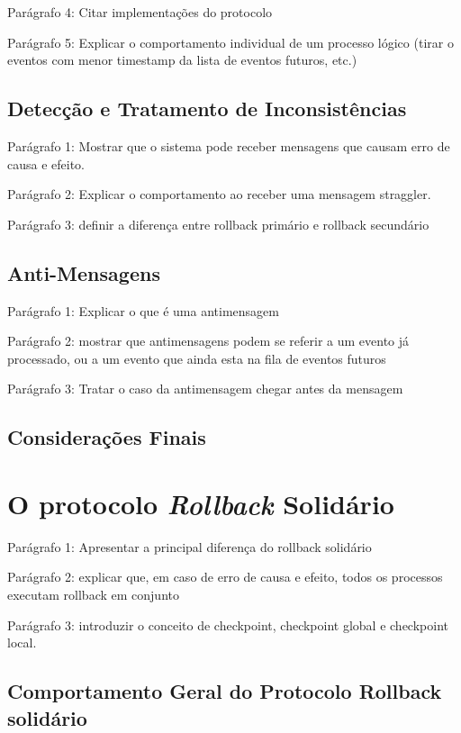 Parágrafo 4: Citar implementações do protocolo

Parágrafo 5: Explicar o comportamento individual de um processo lógico (tirar o eventos com menor timestamp da lista de eventos futuros, etc.)

\subsection{Detecção e Tratamento de Inconsistências}

Parágrafo 1: Mostrar que o sistema pode receber mensagens que causam erro de causa e efeito.

Parágrafo 2: Explicar o comportamento ao receber uma mensagem straggler.

Parágrafo 3: definir a diferença entre rollback primário e rollback secundário

\subsection{Anti-Mensagens}

Parágrafo 1: Explicar o que é uma antimensagem

Parágrafo 2: mostrar que antimensagens podem se referir a um evento já processado, ou a um evento que ainda esta na fila de eventos futuros

Parágrafo 3: Tratar o caso da antimensagem chegar antes da mensagem

\subsection{Considerações Finais}


\section{O protocolo \textit{Rollback} Solidário}

Parágrafo 1: Apresentar a principal diferença do rollback solidário

Parágrafo 2: explicar que, em caso de erro de causa e efeito, todos os processos executam rollback em conjunto

Parágrafo 3: introduzir o conceito de checkpoint, checkpoint global e checkpoint local.

\subsection{Comportamento Geral do Protocolo Rollback solidário}

